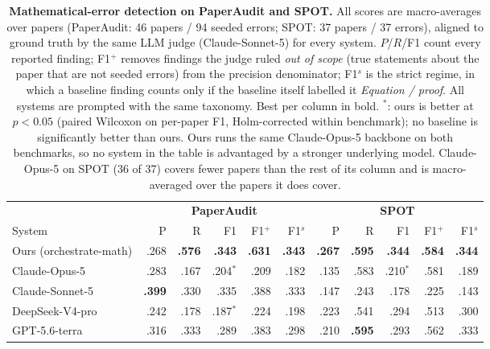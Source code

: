 \begin{table}[t]
\centering\small
\setlength{\tabcolsep}{4.5pt}
\begin{tabular}{l rrrrr rrrrr}
\toprule
 & \multicolumn{5}{c}{\textbf{PaperAudit}} & \multicolumn{5}{c}{\textbf{SPOT}} \\
\cmidrule(lr){2-6}\cmidrule(lr){7-11}
System & P & R & F1 & F1$^{+}$ & F1$^{s}$ & P & R & F1 & F1$^{+}$ & F1$^{s}$ \\
\midrule
Ours (orchestrate-math) & .268 & \textbf{.576} & \textbf{.343} & \textbf{.631} & \textbf{.343} & \textbf{.267} & \textbf{.595} & \textbf{.344} & \textbf{.584} & \textbf{.344} \\
\midrule
Claude-Opus-5 & .283 & .167 & .204$^{*}$ & .209 & .182 & .135 & .583 & .210$^{*}$ & .581 & .189 \\
Claude-Sonnet-5 & \textbf{.399} & .330 & .335 & .388 & .333 & .147 & .243 & .178 & .225 & .143 \\
DeepSeek-V4-pro & .242 & .178 & .187$^{*}$ & .224 & .198 & .223 & .541 & .294 & .513 & .300 \\
GPT-5.6-terra & .316 & .333 & .289 & .383 & .298 & .210 & \textbf{.595} & .293 & .562 & .333 \\
\bottomrule
\end{tabular}
\caption{\textbf{Mathematical-error detection on PaperAudit and SPOT.} All scores are macro-averages over papers (PaperAudit: 46 papers / 94 seeded errors; SPOT: 37 papers / 37 errors), aligned to ground truth by the same LLM judge (Claude-Sonnet-5) for every system. $P$/$R$/F1 count every reported finding; F1$^{+}$ removes findings the judge ruled \emph{out of scope} (true statements about the paper that are not seeded errors) from the precision denominator; F1$^{s}$ is the strict regime, in which a baseline finding counts only if the baseline itself labelled it \emph{Equation / proof}. All systems are prompted with the same taxonomy. Best per column in bold. $^{*}$: ours is better at $p<0.05$ (paired Wilcoxon on per-paper F1, Holm-corrected within benchmark); no baseline is significantly better than ours. Ours runs the same Claude-Opus-5 backbone on both benchmarks, so no system in the table is advantaged by a stronger underlying model. Claude-Opus-5 on SPOT (36 of 37) covers fewer papers than the rest of its column and is macro-averaged over the papers it does cover.}
\label{tab:main}
\end{table}
